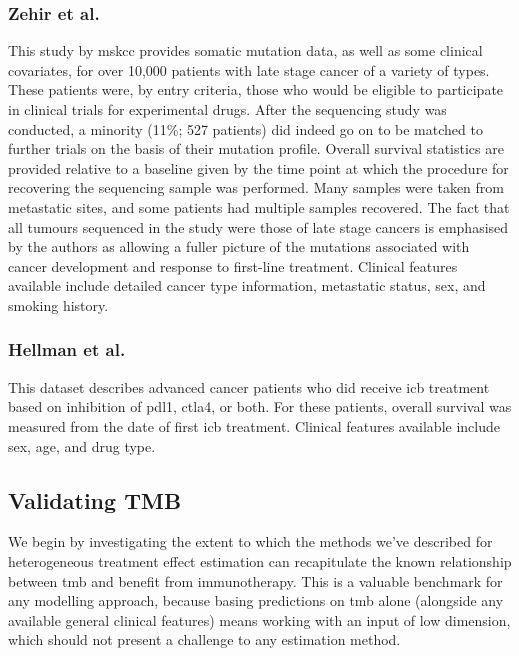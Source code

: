 \documentclass[../thesis.tex]{subfiles}
\begin{document}
\subsubsection*{Zehir et al.}
This study by \gls{mskcc} provides somatic mutation data, as well as some clinical covariates, for over 10,000 patients with late stage cancer of a variety of types. These patients were, by entry criteria, those who would be eligible to participate in clinical trials for experimental drugs. After the sequencing study was conducted, a minority (11\%; 527 patients) did indeed go on to be matched to further trials on the basis of their mutation profile. Overall survival statistics are provided relative to a baseline given by the time point at which the procedure for recovering the sequencing sample was performed. Many samples were taken from metastatic sites, and some patients had multiple samples recovered. The fact that all tumours sequenced in the study were those of late stage cancers is emphasised by the authors as allowing a fuller picture of the mutations associated with cancer development and response to first-line treatment. Clinical features available include detailed cancer type information, metastatic status, sex, and smoking history.

\subsubsection*{Hellman et al.}
This dataset describes advanced cancer patients who did receive \gls{icb} treatment based on inhibition of \gls{pdl1}, \gls{ctla4}, or both. For these patients, overall survival was measured from the date of first \gls{icb} treatment. Clinical features available include sex, age, and drug type.

\subsection{Validating TMB}
We begin by investigating the extent to which the methods we've described for heterogeneous treatment effect estimation can recapitulate the known relationship between \gls{tmb} and benefit from immunotherapy. This is a valuable benchmark for any modelling approach, because basing predictions on \gls{tmb} alone (alongside any available general clinical features) means working with an input of low dimension, which should not present a challenge to any estimation method.
\end{document}

